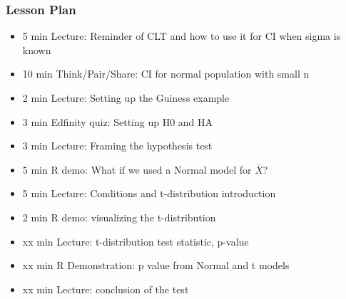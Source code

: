 \begin{frame}
    \frametitle{Lesson Plan}
    \begin{itemize}
        \item 5 min Lecture: Reminder of CLT and how to use it for CI when sigma is known
        \item 10 min Think/Pair/Share: CI for normal population with small n
        \item 2 min Lecture: Setting up the Guiness example
        \item 3 min Edfinity quiz: Setting up H0 and HA
        \item 3 min Lecture: Framing the hypothesis test
        \item 5 min R demo: What if we used a Normal model for \(\bar{X}\)?
        \item 5 min Lecture: Conditions and t-distribution introduction
        \item 2 min R demo: visualizing the t-distribution
        \item xx min Lecture: t-distribution test statistic, p-value
        \item xx min R Demonstration: p value from Normal and t models
        \item xx min Lecture: conclusion of the test        
    \end{itemize}
\end{frame}
            

